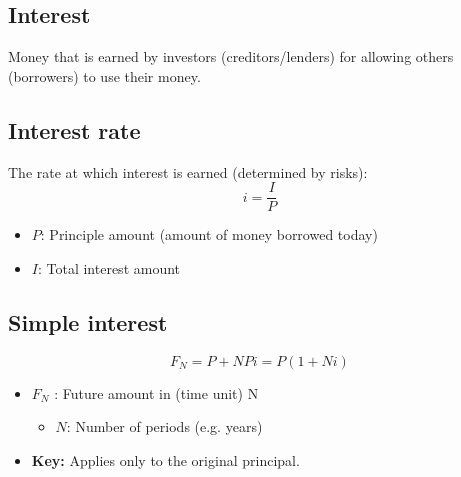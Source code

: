 \subsection{Interest}
\begin{definition}
    Money that is earned by investors (creditors/lenders) for allowing others (borrowers) to use their money.
\end{definition}

\subsection{Interest rate}
\begin{definition}
    The rate at which interest is earned (determined by risks):
    \begin{equation}
        i = \frac{I}{P}
    \end{equation}
    \begin{itemize}
        \item \(P\): Principle amount (amount of money borrowed today)
        \item \(I\): Total interest amount 
    \end{itemize}
\end{definition}

\subsection{Simple interest}
\begin{definition}
    \begin{equation}
        F_N = P + NPi = P(1 + Ni)
    \end{equation}
    \begin{itemize}
        \item \(F_N\) : Future amount in (time unit) N
        \begin{itemize}
            \item \(N\): Number of periods (e.g. years)
        \end{itemize}
        \item \textbf{Key:} Applies only to the original principal.
    \end{itemize}
\end{definition}




